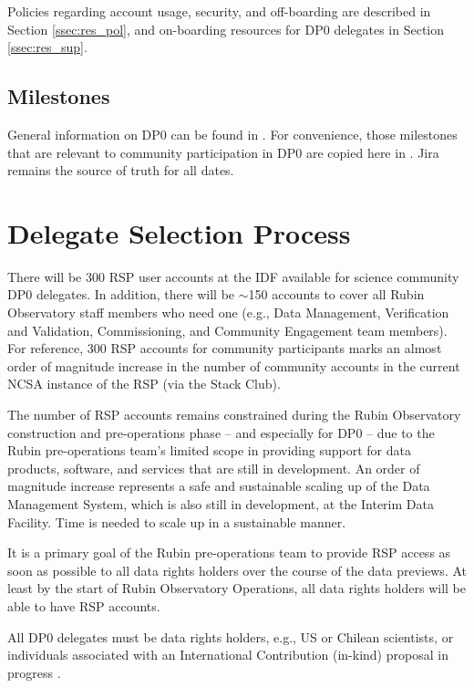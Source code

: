 \documentclass[DM,lsstdraft,authoryear,toc]{lsstdoc}
\begin{document}
Policies regarding account usage, security, and off-boarding are described in Section \ref{ssec:res_pol}, and on-boarding resources for DP0 delegates in Section \ref{ssec:res_sup}. 

\subsection{Milestones}
General information on DP0 can be found in .
For convenience, those milestones  that are relevant to community participation in DP0 are copied here in . 
Jira remains the source of truth for all dates. 


\section{Delegate Selection Process}\label{sec:sel}

There will be 300 RSP user accounts at the IDF available for science community DP0 delegates.
In addition, there will be $\sim$150 accounts to cover all Rubin Observatory staff members who need one (e.g., Data Management, Verification and Validation, Commissioning, and Community Engagement team members).
For reference, 300 RSP accounts for community participants marks an almost order of magnitude increase in the number of community accounts in the current NCSA instance of the RSP (via the Stack Club).

The number of RSP accounts remains constrained during the Rubin Observatory construction and pre-operations phase -- and especially for DP0 -- due to the Rubin pre-operations team's limited scope in providing support for data products, software, and services that are still in development.
An order of magnitude increase represents a safe and sustainable scaling up of the Data Management System, which is also still in development, at the Interim Data Facility.
Time is needed to scale up in a sustainable manner.

It is a primary goal of the Rubin pre-operations team to provide RSP access as soon as possible to all data rights holders over the course of the data previews. 
At least by the start of Rubin Observatory Operations, all data rights holders will be able to have RSP accounts.

All DP0 delegates must be data rights holders, e.g., US or Chilean scientists, or individuals associated with an International Contribution (in-kind) proposal in progress .
\end{document}
